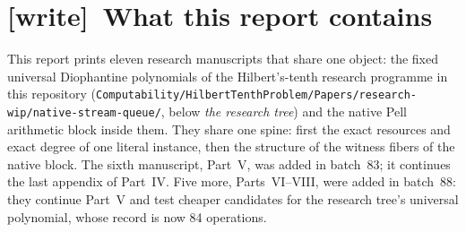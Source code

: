 \documentclass[11pt,letterpaper]{article}
\theoremstyle{definition}\newtheorem{definition}[theorem]{Definition}
\theoremstyle{remark}\newtheorem{remark}[theorem]{Remark}
\newcommand{\wtag}{\textup{[write]}}
\newcommand{\rw}[1]{\nolinkurl{#1}}%
\begin{document}
\section{\wtag\ What this report contains}\label{fup:fm:sec:contents}
This report prints eleven research manuscripts that share one object: the fixed universal Diophantine polynomials of the Hilbert's-tenth research programme in this repository (\rw{Computability/HilbertTenthProblem/Papers/research-wip/native-stream-queue/}, below \emph{the research tree}) and the native Pell arithmetic block inside them. They share one spine: first the exact resources and exact degree of one literal instance, then the structure of the witness fibers of the native block. The sixth manuscript, Part~V, was added in batch~83; it continues the last appendix of Part~IV. Five more, Parts~VI--VIII, were added in batch~88: they continue Part~V and test cheaper candidates for the research tree's universal polynomial, whose record is now 84 operations.
\end{document}
